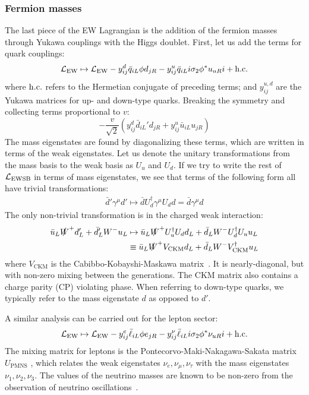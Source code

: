 \subsubsection{Fermion masses}
The last piece of the EW Lagrangian is the addition of the fermion masses through Yukawa couplings with the Higgs doublet. 
First, let us add the terms for quark couplings:
\begin{equation}
   \mathcal{L}_\mathrm{EW} \mapsto \mathcal{L}_\mathrm{EW} - y_{ij}^d \bar q_{iL} \phi d_{jR} - y_{ij}^u \bar q_{iL}i\sigma_2 \phi^* u_{uR}i + \mathrm{h.c.}
\end{equation}
where $\mathrm{h.c.}$ refers to the Hermetian conjugate of preceding terms; and $y_{ij}^{u,d}$ are the Yukawa matrices for up- and down-type quarks.
Breaking the symmetry and collecting terms proportional to $v$:
\begin{equation}
    -\frac{v}{\sqrt{2}}\left(y_{ij}^d \bar d_{iL}' d_{jR} + y_{ij}^u \bar u_{iL} u_{jR}\right) 
\end{equation}
The mass eigenstates are found by diagonalizing these terms, which are written in terms of the weak eigenstates.
Let us denote the unitary transformations from the mass basis to the weak basis as $U_u$ and $U_d$. 
If we try to write the rest of $\mathcal{L}_\mathrm{EWSB}$ in terms of mass eigenstates, we see that terms of the following form all have trivial transformations:
\begin{gather} 
\bar d' \gamma^\mu d' \mapsto \bar d U_d^\dag \gamma^\mu U_d d = \bar d \gamma^\mu d
\end{gather}
The only non-trivial transformation is in the charged weak interaction:
\begin{align} 
\bar u_L \slashed W^+ d'_L + \bar d'_L W^- u_L &\mapsto 
    \bar u_L \slashed W^+ U_u^\dag U_d d_L + \bar d_L W^- U_d^\dag U_u u_L \nonumber \\
    &\equiv \bar u_L \slashed W^+ V_\mathrm{CKM} d_L + \bar d_L W^- V^\dag_\mathrm{CKM} u_L
\end{align}
where $V_\mathrm{CKM}$ is the Cabibbo-Kobayshi-Maskawa matrix~\cite{ckm1,ckm2}.
It is nearly-diagonal, but with non-zero mixing between the generations. 
The CKM matrix also contains a charge parity (CP) violating phase.
When referring to down-type quarks, we typically refer to the mass eigenstate $d$ as opposed to $d'$.

A similar analysis can be carried out for the lepton sector:
\begin{equation}
   \mathcal{L}_\mathrm{EW} \mapsto \mathcal{L}_\mathrm{EW} - y_{ij}^e \bar \ell_{iL} \phi e_{jR} - y_{ij}^\nu \bar \ell_{iL}i\sigma_2 \phi^* \nu_{uR}i + \mathrm{h.c.}
\end{equation}
The mixing matrix for leptons is the Pontecorvo-Maki-Nakagawa-Sakata matrix $U_\mathrm{PMNS}$ \cite{pmns}, which relates the weak eigenstates $\nu_e, \nu_\mu,\nu_\tau$ with the mass eigenstates $\nu_1,\nu_2,\nu_3$.
The values of the neutrino masses are known to be non-zero from the observation of neutrino oscillations~\cite{nuosc}.

